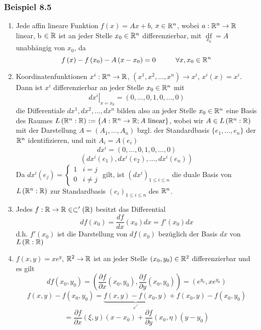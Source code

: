 \subsubsection*{Beispiel 8.5}
\begin{enumerate}[\indent a)]
\item Jede affin lineare Funktion $f(x)=Ax+b$, $x\in\mathbb{R}^n$, wobei $a:\mathbb{R}^n\to\mathbb{R}$ linear, b $\in\mathbb{R}$ ist an jeder Stelle $x_0\in\mathbb{R}^n$ differenzierbar, mit $\mathop {df}\limits_{{x_0}} =A$ unabhängig von $x_0$, da
\[f\left( x \right) - f\left( {{x_0}} \right) - A\left( {x - {x_0}} \right) = 0\hspace{10mm}\forall x,{x_0} \in\R^n\]
\item Koordinatenfunktionen $x^i:\mathbb{R}^n\to\mathbb{R}$, $\left( x^1,x^2,\dots,x^n\right)\to x^i$, $x^i(x)=x^i$. Dann ist $x^i$ differenzierbar an jeder Stelle $x_0\in\mathbb{R}^n$ mit \[{\left. {d{x^i}} \right|_{x = {x_0}}} = \left( {0, \ldots ,0,1,0, \ldots ,0} \right)\] die Differentiale $dx^1,dx^2,\dots,dx^n$ bilden also an jeder Stelle $x_0\in\mathbb{R}^n$ eine Basis des Raumes $L\left( {\mathbb{R}^n:\mathbb{R}} \right):=\left\{ A:\mathbb{R}^n\to\mathbb{R}; A\text{ linear}\right\}$, wobei wir $A\in L\left( \mathbb{R}^n:\mathbb{R}\right)$ mit der Darstellung $A=\left( A_1,\dots,A_n\right)$ bzgl. der Standardbasis $\{ e_1,\dots,e_n\}$ der $\mathbb{R}^n$ identifizieren, und mit $A_i=A\left( e_i\right)$ \[d{x^i} = \left( {0, \ldots ,0,1,0, \ldots ,0} \right)\]\[\left( {d{x^i}\left( {{e_1}} \right),d{x^i}\left( {{e_2}} \right), \ldots ,d{x^i}\left( {{e_n}} \right)} \right)\]
Da $d{x^i}\left( {{e_j}} \right) = \left\{ {\begin{array}{*{20}{c}}
1&{i = j}\\
0&{i\not  = j}
\end{array}} \right.$ gilt, ist ${\left( {d{x^i}} \right)_{1 \le i \le n}}$ die duale Basis von $L\left( \mathbb{R}^n:\mathbb{R}\right)$ zur Standardbasis ${\left( {e_i} \right)_{1 \le i \le n}}$ des $\mathbb{R}^n$.
\item Jedes $f:\mathbb{R}\to\mathbb{R}\in\subset '\left(\mathbb{R}\right)$ besitzt das Differential \[df\left( {{x_0}} \right) = \frac{{df}}{{dx}}\left( {{x_0}} \right)dx = f'\left( {{x_0}} \right)dx\] d.h. $f'\left(x_0\right)$ ist die Darstellung von $df\left(x_0\right)$ bezüglich der Basis $dx$ von $L\left(\mathbb{R}:\mathbb{R}\right)$
\item $f\left(x,y\right)=xe^y$, $\mathbb{R}^2\to\mathbb{R}$ ist an jeder Stelle $\left(x_0,y_0\right)\in\mathbb{R}^2$ differenzierbar und es gilt \[df\left( {{x_0},{y_0}} \right) = \left( {\frac{{\partial f}}{{\partial x}}\left( {{x_0},{y_0}} \right),\frac{{\partial f}}{{\partial y}}\left( {{x_0},{y_0}} \right)} \right) = \left( {{e^{{y_0}}},x{e^{{y_0}}}} \right)\] \[f\left( {x,y} \right) - f\left( {{x_0},{y_0}} \right) = \underbrace {f\left( {x,y} \right) - f\left( {{x_0},y} \right)}_ \swarrow  + f\left( {{x_0},y} \right) - f\left( {{x_0},{y_0}} \right)\] \[ = \frac{{\partial f}}{{\partial x}}\left( {\xi ,y} \right)\left( {x - {x_0}} \right) + \frac{{\partial f}}{{\partial y}}\left( {{x_0},\eta } \right)\left( {y - {y_0}} \right)\]

\end{enumerate}
